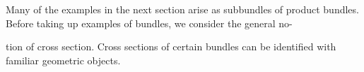 Many of the examples in the next section arise as subbundles of product bundles. Before taking up examples of bundles, we consider the general no-

tion of cross section. Cross sections of certain bundles can be identified with familiar geometric objects.
